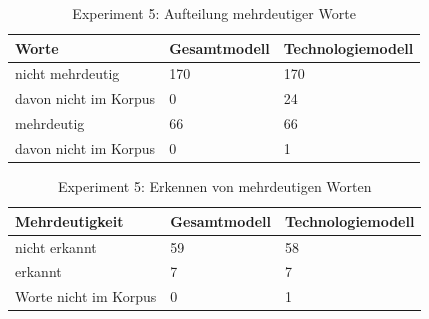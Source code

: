 \documentclass[12pt,a4paper]{report}
\begin{document}
		
		\begin{table}[h]
\caption{Experiment 5: Aufteilung mehrdeutiger Worte}
\label{tab:experiment51}
\begin{center}
\begin{tabular}{|l||l|l|}
\hline
\textbf{Worte}				& \textbf{Gesamtmodell}		  & \textbf{Technologiemodell}   \\

\hline

 nicht mehrdeutig & 170 & 170\\
 
davon nicht im Korpus& 0   	& 24   \\
 \hline
 mehrdeutig & 66   	& 66 \\
davon nicht im Korpus& 0   	& 1   \\
 \hline

\end{tabular}
\end{center}
\end{table}
		\begin{table}[h]
\caption{Experiment 5: Erkennen von mehrdeutigen Worten}
\label{tab:experiment52}
\begin{center}
\begin{tabular}{|l||l|l|}
\hline

\textbf{Mehrdeutigkeit}	& \textbf{Gesamtmodell}	 	& \textbf{Technologiemodell}   \\

 \hline
 nicht erkannt & 59 &   58 \\
 \hline
 erkannt & 7 & 7  \\
\hline
 Worte nicht im Korpus & 0 & 1 \\
 \hline
\end{tabular}
\end{center}
\end{table}
		
\end{document}
